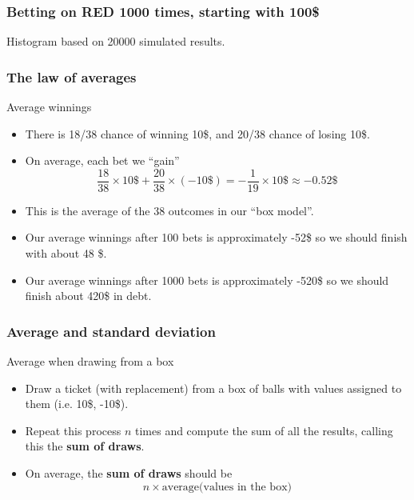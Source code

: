 \documentclass[handout]{beamer}
\begin{document}
   \begin{frame}
   \frametitle{Betting on {\color{red} RED} 1000 times, starting with 100\$}
   \begin{center}
   \end{center}
   Histogram based on 20000 simulated results.
   \end{frame}


   \begin{frame} \frametitle{The law of averages}

   \begin{block}
   {Average winnings}
   \begin{itemize}
   \item There is 18/38 chance of winning 10\$, and 20/38 chance of losing 10\$.
   \item On average, each bet we ``gain''
   $$
   \frac{18}{38} \times 10\$ + \frac{20}{38} \times (-10\$) = -\frac{1}{19} \times 10\$ \approx -0.52\$
   $$
   \item This is the average of the 38 outcomes in our ``box model''.
   \item Our average winnings after 100 bets is approximately -52\$ so
   we should finish with about 48 \$.
   \item Our average winnings after 1000 bets is approximately -520\$
   so we should finish about 420\$ in debt.
   \end{itemize}
   \end{block}
   \end{frame}


   \begin{frame} \frametitle{Average and standard deviation}

   \begin{block}
   {Average when drawing from a box}
   \begin{itemize}
   \item Draw a ticket (with replacement) from a box of balls with values
   assigned to them
   (i.e. 10\$, -10\$).
   \item Repeat this process $n$ times and compute the
   sum of all the results, calling this the {\bf sum of draws}.
   \item On average, the {\bf sum of draws} should be
   $$
   n \times \text{average(values in the box)}
   $$
   \end{itemize}
   \end{block}
   \end{frame}
\end{document}
